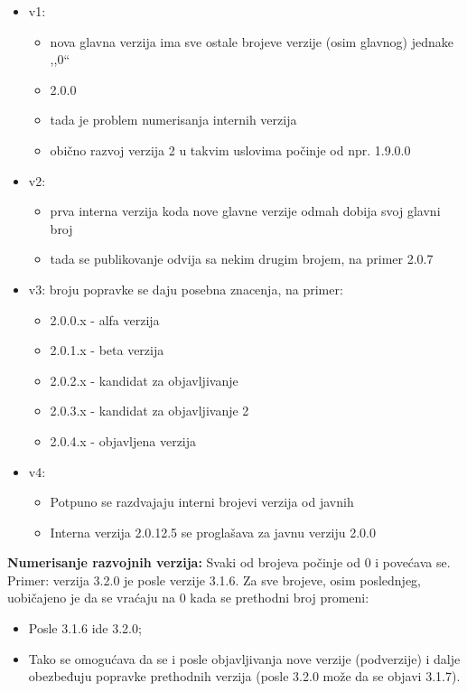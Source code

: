\documentclass[a4paper]{article}
\begin{document}
  \begin{itemize}
    \item v1:
        \begin{itemize}
          \item nova glavna verzija ima sve ostale brojeve verzije (osim glavnog) jednake ,,0``
          \item 2.0.0
          \item tada je problem numerisanja internih verzija
          \item obično razvoj verzija 2 u takvim uslovima počinje od npr. 1.9.0.0
        \end{itemize}
    \item v2:
        \begin{itemize}
          \item prva interna verzija koda nove glavne verzije odmah dobija svoj glavni broj
          \item tada se publikovanje odvija sa nekim drugim brojem, na primer 2.0.7
        \end{itemize}
    \item v3: broju popravke se daju posebna znacenja, na primer:
        \begin{itemize}
          \item 2.0.0.x - alfa verzija
          \item 2.0.1.x - beta verzija
          \item 2.0.2.x - kandidat za objavljivanje
          \item 2.0.3.x - kandidat za objavljivanje 2
          \item 2.0.4.x - objavljena verzija
        \end{itemize}
    \item v4:
        \begin{itemize}
          \item Potpuno se razdvajaju interni brojevi verzija od javnih
          \item Interna verzija 2.0.12.5 se proglašava za javnu verziju 2.0.0
        \end{itemize}
  \end{itemize}
  \textbf{Numerisanje razvojnih verzija:} Svaki od brojeva počinje od 0 i povećava se. Primer: 
  verzija 3.2.0 je posle verzije 3.1.6. Za sve brojeve, osim poslednjeg, uobičajeno je da se 
  vraćaju na 0 kada se prethodni broj promeni:
  \begin{itemize}
    \item Posle 3.1.6 ide 3.2.0;
    \item Tako se omogućava da se i posle objavljivanja nove verzije (podverzije) i dalje 
          obezbeđuju popravke prethodnih verzija (posle 3.2.0 može da se objavi 3.1.7).
  \end{itemize}
\end{document}
